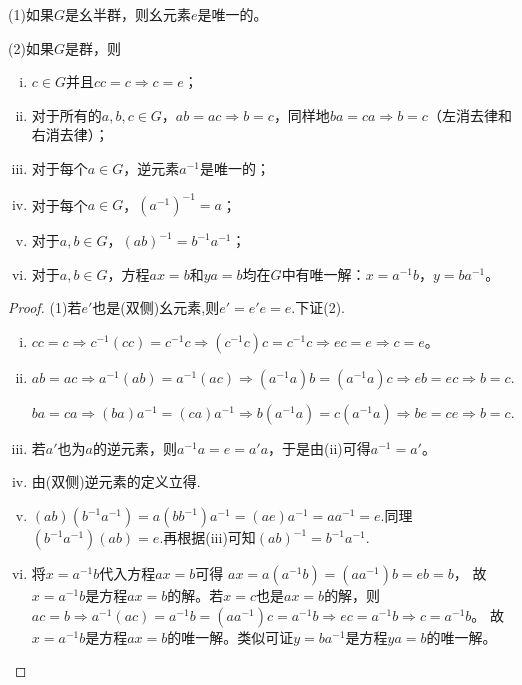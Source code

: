 \documentclass[../../main.tex]{subfiles}
\begin{document}
\begin{theorem}\label{theorem:(幺半)群的基本性质}
(1)如果$G$是幺半群，则幺元素$e$是唯一的。

(2)如果$G$是群，则
\begin{enumerate}[(i)]
\item $c \in G$并且$cc = c \Rightarrow c = e$；

\item 对于所有的$a, b, c \in G$，$ab = ac \Rightarrow b = c$，同样地$ba = ca \Rightarrow b = c$（左消去律和右消去律）；

\item 对于每个$a \in G$，逆元素$a^{-1}$是唯一的；

\item 对于每个$a \in G$，$(a^{-1})^{-1} = a$；

\item 对于$a, b \in G$，$(ab)^{-1} = b^{-1}a^{-1}$；

\item 对于$a, b \in G$，方程$ax = b$和$ya = b$均在$G$中有唯一解：$x = a^{-1}b$，$y = ba^{-1}$。
\end{enumerate}
\end{theorem}
\begin{proof}
(1)若$e'$也是(双侧)幺元素,则$e'=e'e=e$.下证(2).

\begin{enumerate}[(i)]
\item $cc = c \Rightarrow c^{-1}(cc) = c^{-1}c \Rightarrow (c^{-1}c)c = c^{-1}c \Rightarrow ec = e \Rightarrow c = e$。

\item $ab=ac\Rightarrow a^{-1}(ab)=a^{-1}(ac)\Rightarrow (a^{-1}a)b=(a^{-1}a)c\Rightarrow eb=ec\Rightarrow b=c.$

$ba=ca\Rightarrow (ba)a^{-1}=(ca)a^{-1}\Rightarrow b(a^{-1}a)=c(a^{-1}a)\Rightarrow be=ce\Rightarrow b=c.$

\item 若$a'$也为$a$的逆元素，则$a^{-1}a=e=a'a$，于是由(ii)可得$a^{-1}=a'$。

\item 由(双侧)逆元素的定义立得.

\item $(ab)(b^{-1}a^{-1}) = a(bb^{-1})a^{-1} = (ae)a^{-1} = aa^{-1} = e $.同理$(b^{-1}a^{-1})(ab) = e$.再根据(iii)可知$(ab)^{-1} = b^{-1}a^{-1}$.

\item 将$x=a^{-1}b$代入方程$ax=b$可得
$ax=a\left( a^{-1}b \right) =\left( aa^{-1} \right) b=eb=b$，
故$x=a^{-1}b$是方程$ax=b$的解。若$x=c$也是$ax=b$的解，则
$ac=b\Rightarrow a^{-1}\left( ac \right) =a^{-1}b=\left( aa^{-1} \right) c=a^{-1}b\Rightarrow ec=a^{-1}b\Rightarrow c=a^{-1}b$。
故$x=a^{-1}b$是方程$ax=b$的唯一解。类似可证$y=ba^{-1}$是方程$ya=b$的唯一解。
\end{enumerate}

\end{proof}
\end{document}
